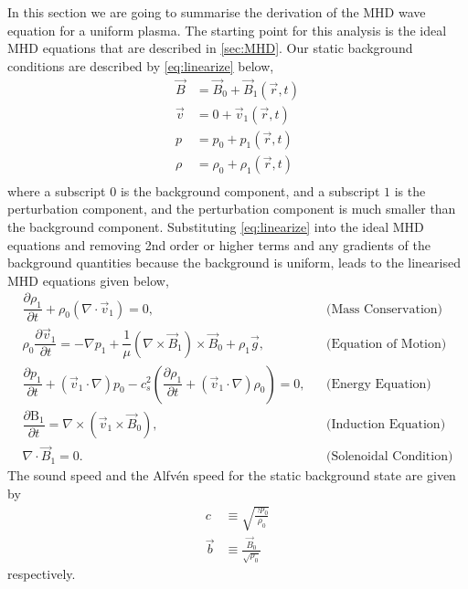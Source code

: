 In this section we are going to summarise the derivation of the MHD wave equation for a uniform plasma.
The starting point for this analysis is the ideal MHD equations that are described in \cref{sec:MHD}.
Our static background conditions are described by \cref{eq:linearize} below,
\begin{equation}\label{eq:linearize}
    \begin{aligned}                                                    
        \vec{B} &= \vec{B}_0 + \vec{B}_1(\vec{r},t)\\
        \vec{v} &= 0 + \vec{v}_1(\vec{r},t)\\
        p &= p_0 + {p_1}(\vec{r},t)\\
        \rho &= \rho_0 + {\rho_1}(\vec{r},t)\\
    \end{aligned}
\end{equation}
where a subscript $0$ is the background component, and a subscript $1$ is the perturbation component, and the perturbation component is much smaller than the background component.
Substituting \cref{eq:linearize} into the ideal MHD equations and removing 2nd order or higher terms and any gradients of the background quantities because the background is uniform, leads to the linearised MHD equations given below,
\begin{align}                                                         
    \dfrac{\partial \rho_1 }{\partial t} + \rho_0 (\nabla \cdot \vec{v}_1) =       
    0,
    &&\text{(Mass Conservation)}\label{eq:lmhd_mass}\\
    \rho_0 \dfrac{\partial \vec{v}_1}{\partial t} =
    -\nabla p_1 + \dfrac{1}{\mu}(\nabla \times \vec{B}_1) \times \vec{B}_0 + \rho_1 \vec{g},
    &&\text{(Equation of Motion)}\label{eq:lmhd_motion}\\
    \dfrac{\partial p_1}{\partial t} + (\vec{v}_1 \cdot \nabla)p_0 - c_s^2 \left( \dfrac{\partial \rho_1}{\partial t} + (\vec{v}_1 \cdot \nabla)\rho_0 \right) = 0,
    &&\text{(Energy Equation)}\label{eq:lmhd_energy}\\
    \dfrac{\partial \mathrm{B}_1}{\partial t} = \nabla \times (\vec{v}_1 \times \vec{B}_0),
    &&\text{(Induction Equation)}\label{eq:lmhd_induction}\\
    \nabla \cdot \vec{B}_1 = 0.
    &&\text{(Solenoidal Condition)}\label{eq:lmhd_solenoid}              
\end{align}
The sound speed and the Alfv\'en speed for the static background state are given by 
\begin{align}
    c &\equiv \sqrt{\frac{\gamma p_0}{\rho_0}}\label{eq:soundspeed}\\
    \vec{b} &\equiv \frac{\vec{B}_0}{\sqrt{\rho_0}}\label{eq:alfvenspeed}
\end{align}
respectively.

